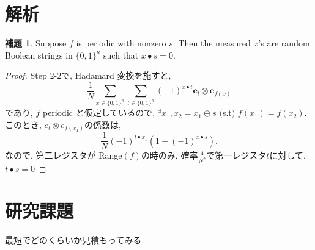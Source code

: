 \documentclass{jsarticle}
\theoremstyle{definition}
\newtheorem{lemma}[theorem]{補題}
\begin{document}
\section{解析} 
\begin{lemma}
Suppose $f$ is periodic with nonzero $s$. Then the measured $x$'s are random Boolean strings in $\{0,1\}^n$ such that $x\bullet s=0$.
\end{lemma}
\begin{proof}
Step $2$-$2$で,  Hadamard 変換を施すと, 
\begin{equation}
\frac{1}{N}\displaystyle\sum_{x\in \{0, 1 \}^n }\displaystyle\sum_{t\in \{ 0,1 \}^n } (-1)^{x\bullet t} \mathbf{e}_t \otimes \mathbf{e}_{f(x)}
\end{equation}
であり, $f$ periodic と仮定しているので, $^{\exists}x_1, x_2=x_1\oplus s $ $($s.t$)$  $f(x_1)=f(x_2)$. このとき, $e_t \otimes e_{f(x_1)}$の係数は, 
\begin{equation}
\frac{1}{N}(-1)^{t\bullet x_1}(1+ (-1)^{x \bullet s}).
\end{equation}
なので, 第二レジスタが Range$(f)$の時のみ, 確率$\frac{4}{N^2}$で第一レジスタ$t$に対して, $t\bullet s=0$
\end{proof}
\section{研究課題}
最短でどのくらいか見積もってみる.
\end{document}
